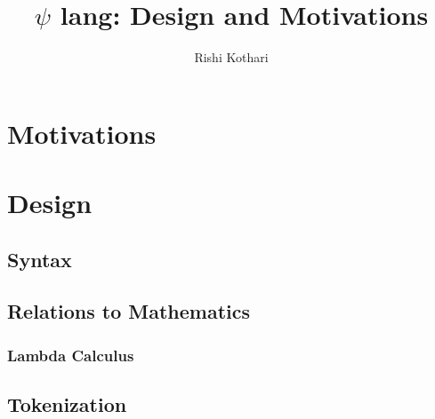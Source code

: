 \documentclass[11pt, oneside]{article}   	%
\title{$\psi$ lang: Design and Motivations}
\author{Rishi Kothari}
\date{}
\begin{document}
\maketitle

\newpage

\tableofcontents

\newpage

\section{Motivations}

\section{Design}

\subsection{Syntax}

\subsection{Relations to Mathematics}

\subsubsection{Lambda Calculus}

\subsection{Tokenization}
\end{document}
